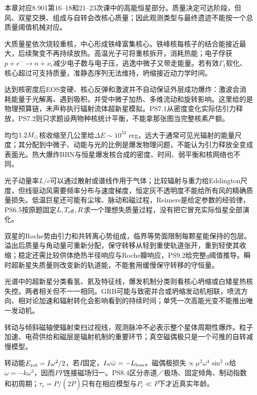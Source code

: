 本章对应8.901第16--18和21--23次课中的高能恒星部分。质量决定可达阶段，但风、双星交换、组成与自转会改核心质量；因此观测类型与最终遗迹不能按一个总质量阈值机械对应。

大质量星依次烧较重核，中心形成铁峰富集核心。铁峰核每核子的结合能接近最大，后续聚变不再持续放热。高温光子可将重核拆开，消耗热能；电子俘获$p+e^-\to n+\nu_e$减少电子数与电子压，逃逸中微子又带走能量。若有效$\Gamma_1$软化、核心超过可支持质量，准静态序列无法维持，坍缩接近动力学时间。

达到核密度后EOS变硬、核心反弹和激波并不自动保证外层成功爆炸：激波会消耗能量于光解离、遇到吸积，并受中微子加热、多维流动和旋转影响。这里给的是物理预算链，未声称执行辐射流体超新星模拟。PS7.1从密度变化实际估引力释放，PS7.2则只求题设两物种核统计平衡，不能拿那张图当完整核素产额。

均匀$1.2M_{\odot}$核收缩至几公里给$\Delta E\sim10^{53}$ erg，远大于通常可见光辐射的能量尺度；其分配到中微子、动能与光的比例是爆发物理问题，不能认为引力释放全变成表面光。热大爆炸BBN与恒星爆发核合成的密度、时间、弱平衡和核网络也不同。

光子动量率$L/c$可以通过散射或谱线作用于气体；比较辐射与重力给Eddington尺度，但线驱动风需要频率分布与速度梯度，恒定灰不透明度不能给所有风的精确质量损失。低温巨星还可能有尘埃、脉动和磁过程，Reimers是给定参数的经验律，PS6.5按原题固定$L,T_{\rm eff},R$求一个理想失质量过程，没有把它冒充实际恒星全部演化。

双星的Roche势由引力和共转离心势组成，临界等势面限制每颗星能保持的包层。溢出后质量与角动量可重新分配，保守转移从轻到重使轨道张开，重到轻使其收缩；稳定还需比较供体绝热半径响应与Roche瓣响应，PS9.2给完整$q$阈值推导。瞬时超新星失质量则改变新的轨道能，不能套用缓慢保守转移的守恒量。

光谱中的超新星分类看氢、氦及特征线，爆发机制分类则看核心坍缩或白矮星热核失控。两者相关但不一一相同。GRB可能与致密并合或坍缩发动机相联，喷流方向、相对论加速和辐射转化会影响看到的持续时间；单凭一次高能光变不能推出唯一发动机。

转动与倾斜磁轴使辐射束扫过视线，观测脉冲不必表示整个星体周期性爆炸。粒子加速、电荷供给和磁层是辐射机制的重要环节；真空磁偶极只是一个可推的自转减慢模型。

转动能$E_{\rm rot}=I\omega^2/2$，若$I$固定，$I\omega\dot\omega=-L_{\rm loss}$。磁偶极损失$\propto\mu^2\omega^4\sin^2\alpha$给$\dot\omega=-k\omega^3$，因而$P\dot P$连接磁场归一。PS8.4区分赤道／极场、固定倾角、制动指数和初周期；$\tau_c=P/(2\dot P)$只有在相应模型与$P_i\ll P$下才近真实年龄。

